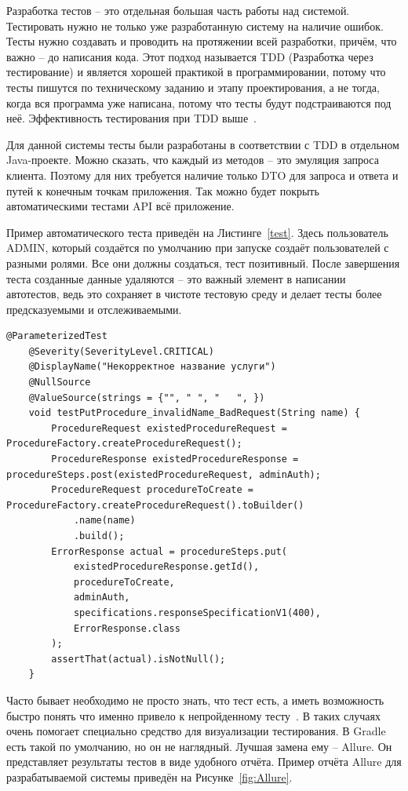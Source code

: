 \documentclass[a4paper,article]{article}
\begin{document}
\begin{sloppypar}
    Разработка тестов -- это отдельная большая часть работы над системой. Тестировать нужно не только уже разработанную систему на наличие ошибок. Тесты нужно создавать и проводить на протяжении всей разработки, причём, что важно -- до написания кода. Этот подход называется TDD (Разработка через тестирование) и является хорошей практикой в программировании, потому что тесты пишутся по техническому заданию и этапу проектирования, а не тогда, когда вся программа уже написана, потому что тесты будут подстраиваются под неё. Эффективность тестирования при TDD выше~\cite{cleancode}.

    Для данной системы тесты были разработаны в соответствии с TDD в отдельном Java-проекте. Можно сказать, что каждый из методов -- это эмуляция запроса клиента. Поэтому для них требуется наличие только DTO для запроса и ответа и путей к конечным точкам приложения. Так можно будет покрыть автоматическими тестами API всё приложение.

    Пример автоматического теста приведён на Листинге~\ref{test}. Здесь пользователь ADMIN, который создаётся по умолчанию при запуске создаёт пользователей с разными ролями. Все они должны создаться, тест позитивный. После завершения теста созданные данные удаляются -- это важный элемент в написании автотестов, ведь это сохраняет в чистоте тестовую среду и делает тесты более предсказуемыми и отслеживаемыми.

    \begin{lstlisting}[label=test,caption=Пример автотеста для разработанной системы]
    @ParameterizedTest
    @Severity(SeverityLevel.CRITICAL)
    @DisplayName("Некорректное название услуги")
    @NullSource
    @ValueSource(strings = {"", " ", "   ", })
    void testPutProcedure_invalidName_BadRequest(String name) {
        ProcedureRequest existedProcedureRequest = ProcedureFactory.createProcedureRequest();
        ProcedureResponse existedProcedureResponse = procedureSteps.post(existedProcedureRequest, adminAuth);
        ProcedureRequest procedureToCreate = ProcedureFactory.createProcedureRequest().toBuilder()
            .name(name)
            .build();
        ErrorResponse actual = procedureSteps.put(
            existedProcedureResponse.getId(),
            procedureToCreate,
            adminAuth,
            specifications.responseSpecificationV1(400),
            ErrorResponse.class
        );
        assertThat(actual).isNotNull();
    }
    \end{lstlisting}

    Часто бывает необходимо не просто знать, что тест есть, а иметь возможность быстро понять что именно привело к непройденному тесту~\cite{springguide}. В таких случаях очень помогает специально средство для визуализации тестирования. В Gradle есть такой по умолчанию, но он не наглядный. Лучшая замена ему -- Allure. Он представляет результаты тестов в виде удобного отчёта. Пример отчёта Allure для разрабатываемой системы приведён на Рисунке~\ref{fig:Allure}.


\end{sloppypar}
\end{document}
